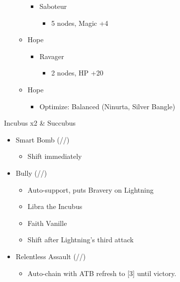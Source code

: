 \begin{multicols}{2}
\begin{menu}
\begin{itemize}
\begin{itemize}
\begin{itemize}
            \item Saboteur
            \begin{itemize}
                \item 5 nodes, Magic +4
            \end{itemize}
        \end{itemize}
        \item Hope
        \begin{itemize}
            \item Ravager
            \begin{itemize}
                \item 2 nodes, HP +20
            \end{itemize}
        \end{itemize}
    \end{itemize}
    \equip
    \begin{itemize}
        \item Hope
        \begin{itemize}
                \item Optimize: Balanced (Ninurta, Silver Bangle)
        \end{itemize}
    \end{itemize}
\end{itemize}
\end{menu}

\renewcommand{\first}{[1] Relentless Assault (\rav/\com/\rav)}
\renewcommand{\second}{[2] Bully (\syn/\com/\sab)}
\renewcommand{\third}{[3] Relentless Assault (\rav/\com/\rav)}
\renewcommand{\fourth}{[4] Smart Bomb (\rav/\rav/\sab)}
\renewcommand{\fifth}{[5] Tri-Disaster (\rav/\rav/\rav)}
\renewcommand{\sixth}{[6] Malevolence (\syn/\rav/\rav)}

\begin{battle}{Incubus x2 \& Succubus}
\begin{itemize}
    \item \fourth
    \begin{itemize}
        \item Shift immediately
    \end{itemize}
    \item \second
    \begin{itemize}
        \item Auto-support, puts Bravery on Lightning
        \item Libra the Incubus
        \item Faith Vanille
        \item Shift after Lightning's third attack
    \end{itemize}
    \item \first
    \begin{itemize}
        \item Auto-chain with ATB refresh to [3] until victory.
    \end{itemize}
\end{itemize}
 
\end{battle}
\end{multicols}
